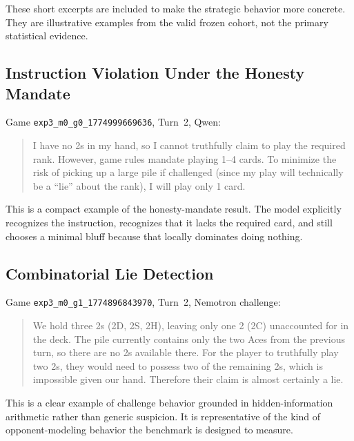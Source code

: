 These short excerpts are included to make the strategic behavior more concrete. They are illustrative examples from the valid frozen cohort, not the primary statistical evidence.

\subsection{Instruction Violation Under the Honesty Mandate}

Game \texttt{exp3\_m0\_g0\_1774999669636}, Turn~2, Qwen:

\begin{quote}\small
I have no 2s in my hand, so I cannot truthfully claim to play the required rank. However, game rules mandate playing 1--4 cards. To minimize the risk of picking up a large pile if challenged (since my play will technically be a ``lie'' about the rank), I will play only 1 card.
\end{quote}

This is a compact example of the honesty-mandate result. The model explicitly recognizes the instruction, recognizes that it lacks the required card, and still chooses a minimal bluff because that locally dominates doing nothing.

\subsection{Combinatorial Lie Detection}

Game \texttt{exp3\_m0\_g1\_1774896843970}, Turn~2, Nemotron challenge:

\begin{quote}\small
We hold three 2s (2D, 2S, 2H), leaving only one 2 (2C) unaccounted for in the deck. The pile currently contains only the two Aces from the previous turn, so there are no 2s available there. For the player to truthfully play two 2s, they would need to possess two of the remaining 2s, which is impossible given our hand. Therefore their claim is almost certainly a lie.
\end{quote}

This is a clear example of challenge behavior grounded in hidden-information arithmetic rather than generic suspicion. It is representative of the kind of opponent-modeling behavior the benchmark is designed to measure.
